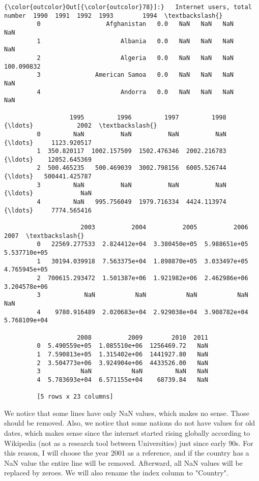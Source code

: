 \documentclass[11pt]{article}
\begin{document}
\begin{Verbatim}[commandchars=\\\{\}]
{\color{outcolor}Out[{\color{outcolor}78}]:}   Internet users, total number  1990  1991  1992  1993        1994  \textbackslash{}
         0                  Afghanistan   0.0   NaN   NaN   NaN         NaN   
         1                      Albania   0.0   NaN   NaN   NaN         NaN   
         2                      Algeria   0.0   NaN   NaN   NaN  100.090832   
         3               American Samoa   0.0   NaN   NaN   NaN         NaN   
         4                      Andorra   0.0   NaN   NaN   NaN         NaN   
         
                  1995         1996         1997         1998  {\ldots}            2002  \textbackslash{}
         0         NaN          NaN          NaN          NaN  {\ldots}     1123.920517   
         1  350.820117  1002.157509  1502.476346  2002.216783  {\ldots}    12052.645369   
         2  500.465235   500.469039  3002.798156  6005.526744  {\ldots}   500441.425787   
         3         NaN          NaN          NaN          NaN  {\ldots}             NaN   
         4         NaN   995.756049  1979.716334  4424.113974  {\ldots}     7774.565416   
         
                     2003          2004          2005          2006          2007  \textbackslash{}
         0   22569.277533  2.824412e+04  3.380450e+05  5.988651e+05  5.537710e+05   
         1   30194.039918  7.563375e+04  1.898870e+05  3.033497e+05  4.765945e+05   
         2  700615.293472  1.501387e+06  1.921982e+06  2.462986e+06  3.204578e+06   
         3            NaN           NaN           NaN           NaN           NaN   
         4    9780.916489  2.020683e+04  2.929038e+04  3.908782e+04  5.768109e+04   
         
                    2008          2009        2010  2011  
         0  5.490559e+05  1.085510e+06  1256469.72   NaN  
         1  7.590813e+05  1.315402e+06  1441927.80   NaN  
         2  3.504773e+06  3.924904e+06  4433526.00   NaN  
         3           NaN           NaN         NaN   NaN  
         4  5.783693e+04  6.571155e+04    68739.84   NaN  
         
         [5 rows x 23 columns]
\end{Verbatim}
            
    We notice that some lines have only NaN values, which makes no sense.
Those should be removed. Also, we notice that some nations do not have
values for old dates, which makes sense since the internet started
rising globally according to Wikipedia (not as a research tool between
Universities) just since early 90s. For this reason, I will choose the
year 2001 as a reference, and if the country has a NaN value the entire
line will be removed. Afterward, all NaN values will be replaced by
zeroes. We will also rename the index column to "Country".
\end{document}
